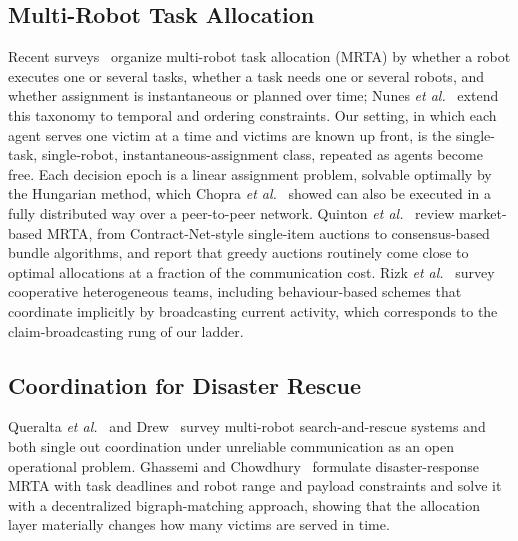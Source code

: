 \documentclass[conference]{IEEEtran}
\begin{document}
\subsection{Multi-Robot Task Allocation}
Recent surveys~\cite{aziz2022,chakraa2023,athira2024} organize multi-robot task allocation (MRTA) by whether a robot executes one or several tasks, whether a task needs one or several robots, and whether assignment is instantaneous or planned over time; Nunes \emph{et al.}~\cite{nunes2017} extend this taxonomy to temporal and ordering constraints. Our setting, in which each agent serves one victim at a time and victims are known up front, is the single-task, single-robot, instantaneous-assignment class, repeated as agents become free. Each decision epoch is a linear assignment problem, solvable optimally by the Hungarian method, which Chopra \emph{et al.}~\cite{chopra2017} showed can also be executed in a fully distributed way over a peer-to-peer network. Quinton \emph{et al.}~\cite{quinton2023} review market-based MRTA, from Contract-Net-style single-item auctions to consensus-based bundle algorithms, and report that greedy auctions routinely come close to optimal allocations at a fraction of the communication cost. Rizk \emph{et al.}~\cite{rizk2019} survey cooperative heterogeneous teams, including behaviour-based schemes that coordinate implicitly by broadcasting current activity, which corresponds to the claim-broadcasting rung of our ladder.

\subsection{Coordination for Disaster Rescue}
Queralta \emph{et al.}~\cite{queralta2020} and Drew~\cite{drew2021} survey multi-robot search-and-rescue systems and both single out coordination under unreliable communication as an open operational problem. Ghassemi and Chowdhury~\cite{ghassemi2022} formulate disaster-response MRTA with task deadlines and robot range and payload constraints and solve it with a decentralized bigraph-matching approach, showing that the allocation layer materially changes how many victims are served in time.
\end{document}
